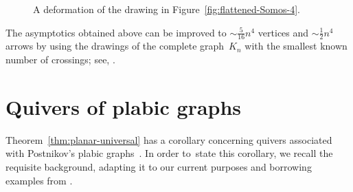 \begin{figure}[ht]\centering
{}

\caption{A deformation of the drawing in Figure~\ref{fig:flattened-Somos-4}.}
\label{fig:very-flattened-Somos-4}
\end{figure}

\begin{remark}
The asymptotics obtained above can be improved to $\sim\frac5{16} n^4$ vertices and $\sim \frac12 n^4$ arrows by using the drawings of the complete graph~$K_n$ with the smallest known number of crossings; see, \eg \cite[Section~13.2]{szekely}. 
\end{remark}


\section{Quivers of plabic graphs}
\label{sec:quivers-plabic}

Theorem~\ref{thm:planar-universal} has a corollary concerning quivers
associated with Postnikov's plabic graphs~\cite{postnikov}. 
In order to~state this corollary, we recall the requisite background,
adapting it to our current purposes and borrowing examples from
\cite[Section~6]{FPST}. 

